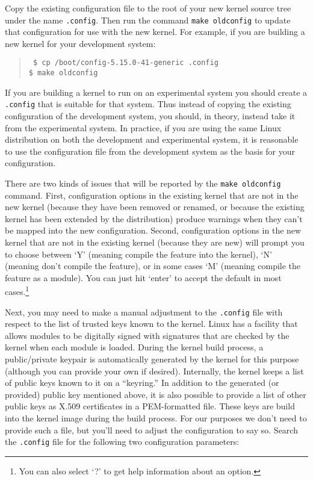 \documentclass{article}
\newcommand{\command}[1]{\texttt{#1}}
\newcommand{\filename}[1]{\texttt{#1}}
\newenvironment{commands}
  {\begin{quote} \tt}
  {\end{quote}}
\begin{document}
Copy the existing configuration file to the root of your new kernel source tree under the name
\filename{.config}. Then run the command \command{make oldconfig} to update that configuration
for use with the new kernel. For example, if you are building a new kernel for your development
system:
\begin{commands}
  \$ cp /boot/config-5.15.0-41-generic .config \\
  \$ make oldconfig
\end{commands}

If you are building a kernel to run on an experimental system you should create a
\filename{.config} that is suitable for that system. Thus instead of copying the existing
configuration of the development system, you should, in theory, instead take it from the
experimental system. In practice, if you are using the same Linux distribution on both the
development and experimental system, it is reasonable to use the configuration file from the
development system as the basis for your configuration.

There are two kinds of issues that will be reported by the \command{make oldconfig} command.
First, configuration options in the existing kernel that are not in the new kernel (because they
have been removed or renamed, or because the existing kernel has been extended by the
distribution) produce warnings when they can't be mapped into the new configuration. Second,
configuration options in the new kernel that are not in the existing kernel (because they are
new) will prompt you to choose between `Y' (meaning compile the feature into the kernel), `N'
(meaning don't compile the feature), or in some cases `M' (meaning compile the feature as a
module). You can just hit `enter' to accept the default in most cases.\footnote{You can also
  select `?' to get help information about an option.}

Next, you may need to make a manual adjustment to the \filename{.config} file with respect to
the list of trusted keys known to the kernel. Linux has a facility that allows modules to be
digitally signed with signatures that are checked by the kernel when each module is loaded.
During the kernel build process, a public/private keypair is automatically generated by the
kernel for this purpose (although you can provide your own if desired). Internally, the kernel
keeps a list of public keys known to it on a ``keyring.'' In addition to the generated (or
provided) public key mentioned above, it is also possible to provide a list of other public keys
as X.509 certificates in a PEM-formatted file. These keys are build into the kernel image during
the build process. For our purposes we don't need to provide such a file, but you'll need to
adjust the configuration to say so. Search the \filename{.config} file for the following two
configuration parameters:
\end{document}
